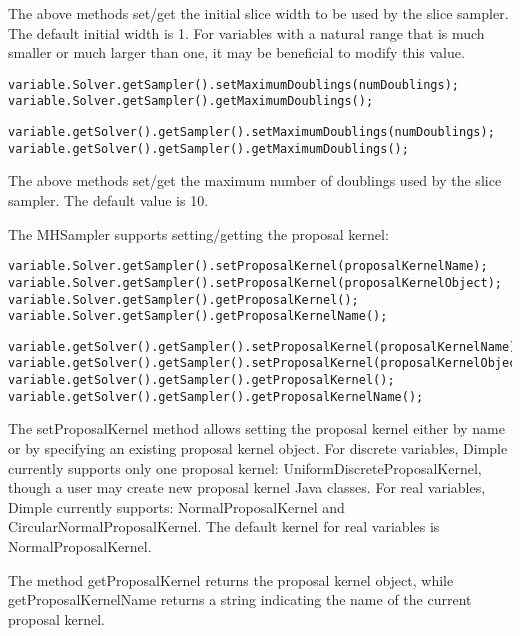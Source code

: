 The above methods set/get the initial slice width to be used by the slice sampler.  The default initial width is 1.  For variables with a natural range that is much smaller or much larger than one, it may be beneficial to modify this value.

\ifmatlab
\begin{lstlisting}
variable.Solver.getSampler().setMaximumDoublings(numDoublings);
variable.Solver.getSampler().getMaximumDoublings();
\end{lstlisting}
\fi

\ifjava
\begin{lstlisting}
variable.getSolver().getSampler().setMaximumDoublings(numDoublings);
variable.getSolver().getSampler().getMaximumDoublings();
\end{lstlisting}
\fi

The above methods set/get the maximum number of doublings used by the slice sampler.  The default value is 10.

The MHSampler supports setting/getting the proposal kernel:

\ifmatlab
\begin{lstlisting}
variable.Solver.getSampler().setProposalKernel(proposalKernelName);
variable.Solver.getSampler().setProposalKernel(proposalKernelObject);
variable.Solver.getSampler().getProposalKernel();
variable.Solver.getSampler().getProposalKernelName();
\end{lstlisting}
\fi

\ifjava
\begin{lstlisting}
variable.getSolver().getSampler().setProposalKernel(proposalKernelName);
variable.getSolver().getSampler().setProposalKernel(proposalKernelObject);
variable.getSolver().getSampler().getProposalKernel();
variable.getSolver().getSampler().getProposalKernelName();
\end{lstlisting}
\fi

The setProposalKernel method allows setting the proposal kernel either by name or by specifying an existing proposal kernel object.  For discrete variables, Dimple currently supports only one proposal kernel: UniformDiscreteProposalKernel, though a user may create new proposal kernel Java classes.  For real variables, Dimple currently supports: NormalProposalKernel and CircularNormalProposalKernel.  The default kernel for real variables is NormalProposalKernel.

The method getProposalKernel returns the proposal kernel object, while getProposalKernelName returns a string indicating the name of the current proposal kernel.

